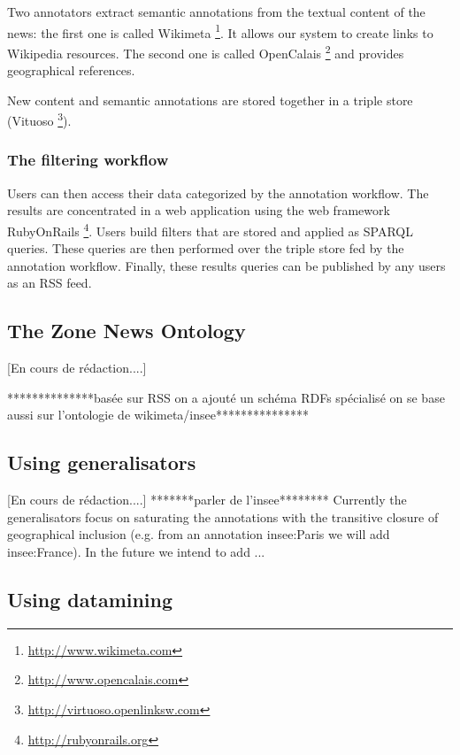 \documentclass{llncs}
\begin{document}
Two annotators extract semantic annotations from the textual content of the news: the first one is called Wikimeta \footnote{\url{http://www.wikimeta.com}}. It allows our system to create links to Wikipedia resources. The second one is called OpenCalais \footnote{\url{http://www.opencalais.com}} and provides geographical references.

New content and semantic annotations are stored together in a triple store (Vituoso \footnote{\url{http://virtuoso.openlinksw.com}}). 

\subsubsection{The filtering workflow}
Users can then access their data categorized by the annotation workflow. The results are concentrated in a web application using the web framework RubyOnRails \footnote{\url{http://rubyonrails.org}}. Users build filters that are stored and applied as SPARQL queries. These queries are then performed over the triple store fed by the annotation workflow. Finally, these results queries can be published by any users as an RSS feed.

%
\subsection{The Zone News Ontology}
%
[En cours de rédaction....]


**************basée sur RSS
on a ajouté un schéma RDFs spécialisé
on se base aussi sur l'ontologie de wikimeta/insee***************
%

%
\subsection{Using generalisators}
[En cours de rédaction....]
*******parler de l'insee********
Currently the generalisators focus on saturating the annotations with the transitive closure of geographical inclusion (e.g. from an annotation insee:Paris we will add insee:France). 
In the future we intend to add ...
 

%
\subsection{Using datamining}
\end{document}
